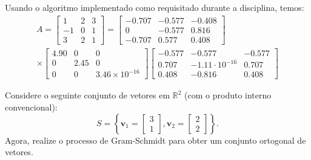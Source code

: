 \begin{resolution}
  Usando o algoritmo implementado como requisitado durante a disciplina, temos:
  \begin{multline*}
    A = \begin{bmatrix}
      1  & 2 & 3 \\
      -1 & 0 & 1 \\
      3  & 2 & 1
    \end{bmatrix} =
    \begin{bmatrix}
      -0.707 & -0.577 & -0.408 \\
      0      & -0.577 & 0.816  \\
      -0.707 & 0.577  & 0.408
    \end{bmatrix} \\ \times \begin{bmatrix}
      4.90 & 0    & 0                    \\
      0    & 2.45 & 0                    \\
      0    & 0    & 3.46 \times 10^{-16}
    \end{bmatrix} \begin{bmatrix}
      -0.577 & -0.577               & -0.577 \\
      0.707  & -1.11 \cdot 10^{-16} & 0.707  \\
      0.408  & -0.816               & 0.408
    \end{bmatrix}
  \end{multline*}
\end{resolution}

\begin{question}
  Considere o seguinte conjunto de vetores em $\mathbb{R}^2$ (com o produto interno convencional):
  \[
    S = \left\{ \mathbf{v}_1 =
    \begin{bmatrix}
      3 \\
      1
    \end{bmatrix}, \mathbf{v}_2 =
    \begin{bmatrix}
      2 \\
      2
    \end{bmatrix} \right\}.
  \]
  Agora, realize o processo de Gram-Schmidt para obter um conjunto ortogonal de vetores.
\end{question}

